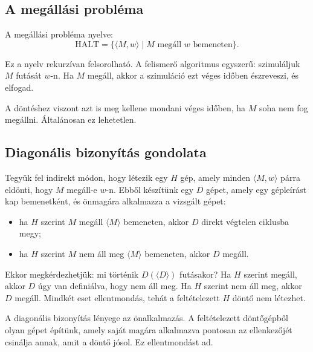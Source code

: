 \subsection{A megállási probléma}

A megállási probléma nyelve:
\[
  \mathrm{HALT}=\{\langle M,w\rangle\mid M \text{ megáll } w \text{ bemeneten}\}.
\]

Ez a nyelv rekurzívan felsorolható. A felismerő algoritmus egyszerű: szimuláljuk $M$ futását $w$-n. Ha $M$ megáll, akkor a szimuláció ezt véges időben észreveszi, és elfogad.

A döntéshez viszont azt is meg kellene mondani véges időben, ha $M$ soha nem fog megállni. Általánosan ez lehetetlen.

\subsection{Diagonális bizonyítás gondolata}

Tegyük fel indirekt módon, hogy létezik egy $H$ gép, amely minden $\langle M,w\rangle$ párra eldönti, hogy $M$ megáll-e $w$-n. Ebből készítünk egy $D$ gépet, amely egy gépleírást kap bemenetként, és önmagára alkalmazza a vizsgált gépet:

\begin{itemize}
  \item ha $H$ szerint $M$ megáll $\langle M\rangle$ bemeneten, akkor $D$ direkt végtelen ciklusba megy;
  \item ha $H$ szerint $M$ nem áll meg $\langle M\rangle$ bemeneten, akkor $D$ megáll.
\end{itemize}

Ekkor megkérdezhetjük: mi történik $D(\langle D\rangle)$ futásakor? Ha $H$ szerint megáll, akkor $D$ úgy van definiálva, hogy nem áll meg. Ha $H$ szerint nem áll meg, akkor $D$ megáll. Mindkét eset ellentmondás, tehát a feltételezett $H$ döntő nem létezhet.




\begin{summarybox}
A diagonális bizonyítás lényege az önalkalmazás. A feltételezett döntőgépből olyan gépet építünk, amely saját magára alkalmazva pontosan az ellenkezőjét csinálja annak, amit a döntő jósol. Ez ellentmondást ad.
\end{summarybox}

